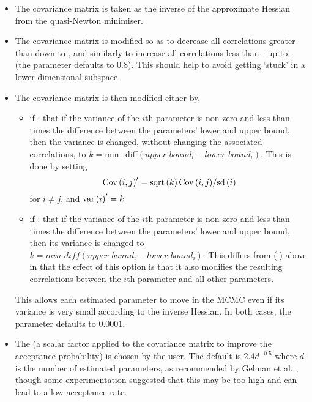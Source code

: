 \begin{itemize}
\item The covariance matrix is taken as the inverse of the approximate Hessian from the quasi-Newton minimiser.
\item The covariance matrix is modified so as to decrease all correlations greater than  down to , and similarly to increase all correlations less than  - up to - (the  parameter defaults to 0.8). This should help to avoid getting `stuck' in a lower-dimensional subspace.

\item The covariance matrix is then modified either by,

\begin{itemize}
\item if : that if the variance of the $i$th parameter is non-zero and less than  times the difference between the parameters' lower and upper bound, then the variance is changed, without changing the associated correlations, to $k=$min\_diff$(upper\_bound_i-lower\_bound_i)$. This is done by setting \[
{\mathop{\rm Cov}\nolimits} \left( {i,j} \right)^\prime   = {{{\mathop{\rm sqrt}\nolimits} \left( k \right){\mathop{\rm Cov}\nolimits} \left( {i,j} \right)} \mathord{\left/
{\vphantom {{{\mathop{\rm sqrt}\nolimits} \left( k \right){\mathop{\rm Cov}\nolimits} \left( {i,j} \right)} {{\mathop{\rm sd}\nolimits} \left( i \right)}}} \right.
\kern-\nulldelimiterspace} {{\mathop{\rm sd}\nolimits} \left( i \right)}}
\]
for $i \ne j$, and ${\mathop{\rm var}} \left( i \right)^\prime   = k$

\item if : that if the variance of the $i$th parameter is non-zero and less than  times the difference between the parameters' lower and upper bound, then its variance is changed to $k=min\_diff(upper\_bound_i-lower\_bound_i)$. This differs from (i) above in that the effect of this option is that it also modifies the resulting correlations between the $i$th parameter and all other parameters.
\end{itemize}

This allows each estimated parameter to move in the MCMC even if its variance is very small according to the inverse Hessian. In both cases, the  parameter defaults to $0.0001$.

\item The  (a scalar factor applied to the covariance matrix to improve the acceptance probability) is chosen by the user. The default is $2.4d^{-0.5}$ where $d$ is the number of estimated parameters, as recommended by Gelman et al. \citep{823}, though some experimentation suggested that this may be too high and can lead to a low acceptance rate. 
\end{itemize}

